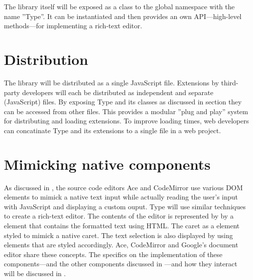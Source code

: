 The library itself will be exposed as a class to the global namespace with the name ''Type''. It can be instantiated and then provides an own API---high-level methods---for implementing a rich-text editor.




\section{Distribution}

The library will be distributed as a single JavaScript file. Extensions by third-party developers will each be distributed as independent and separate (JavaScript) files. By exposing Type and its classes as discussed in section  they can be accessed from other files. This provides a modular ''plug and play'' system for distributing and loading extensions. To improve loading times, web developers can concatinate Type and its extensions to a single file in a web project.

\section{Mimicking native components}

As discussed in , the source code editors Ace and CodeMirror use various DOM elements to mimick a native text input while actually reading the user's input with JavaScript and displaying a custom ouput. Type will use similar techniques to create a rich-text editor. The contents of the editor is represented by by a  element that contains the formatted text using HTML. The caret as a  element styled to mimick a native caret. The text selection is also displayed by using  elements that are styled accordingly. Ace, CodeMirror and Google's document editor share these concepts. The specifics on the implementation of these components---and the other components discussed in ---and how they interact will be discussed in .



